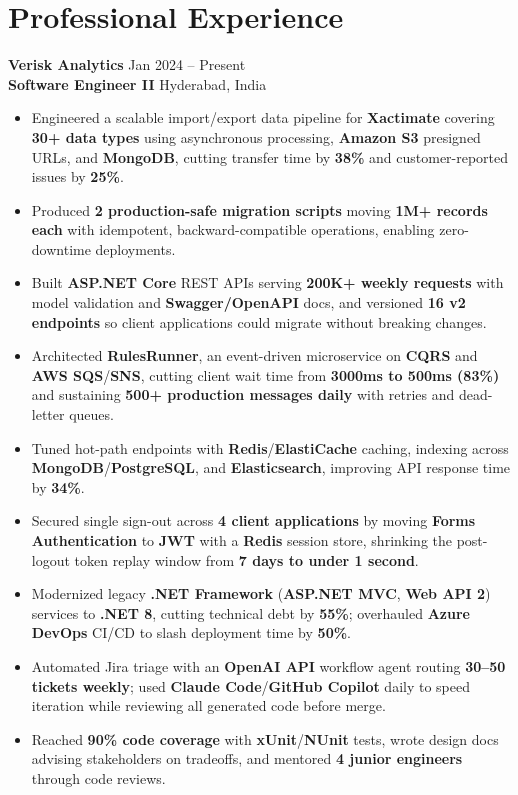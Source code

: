 \documentclass[letterpaper,10pt]{article}
\begin{document}
\section*{Professional Experience}

\textbf{Verisk Analytics} \hfill Jan 2024 -- Present \\
\textbf{Software Engineer II} \hfill Hyderabad, India
\begin{itemize}
    \item Engineered a scalable import/export data pipeline for \textbf{Xactimate} covering \textbf{30+ data types} using asynchronous processing, \textbf{Amazon S3} presigned URLs, and \textbf{MongoDB}, cutting transfer time by \textbf{38\%} and customer-reported issues by \textbf{25\%}.
    \item Produced \textbf{2 production-safe migration scripts} moving \textbf{1M+ records each} with idempotent, backward-compatible operations, enabling zero-downtime deployments.
    \item Built \textbf{ASP.NET Core} REST APIs serving \textbf{200K+ weekly requests} with model validation and \textbf{Swagger/OpenAPI} docs, and versioned \textbf{16 v2 endpoints} so client applications could migrate without breaking changes.
    \item Architected \textbf{RulesRunner}, an event-driven microservice on \textbf{CQRS} and \textbf{AWS SQS}/\textbf{SNS}, cutting client wait time from \textbf{3000ms to 500ms (83\%)} and sustaining \textbf{500+ production messages daily} with retries and dead-letter queues.
    \item Tuned hot-path endpoints with \textbf{Redis}/\textbf{ElastiCache} caching, indexing across \textbf{MongoDB}/\textbf{PostgreSQL}, and \textbf{Elasticsearch}, improving API response time by \textbf{34\%}.
    \item Secured single sign-out across \textbf{4 client applications} by moving \textbf{Forms Authentication} to \textbf{JWT} with a \textbf{Redis} session store, shrinking the post-logout token replay window from \textbf{7 days to under 1 second}.
    \item Modernized legacy \textbf{.NET Framework} (\textbf{ASP.NET MVC}, \textbf{Web API 2}) services to \textbf{.NET 8}, cutting technical debt by \textbf{55\%}; overhauled \textbf{Azure DevOps} CI/CD to slash deployment time by \textbf{50\%}.
    \item Automated Jira triage with an \textbf{OpenAI API} workflow agent routing \textbf{30--50 tickets weekly}; used \textbf{Claude Code}/\textbf{GitHub Copilot} daily to speed iteration while reviewing all generated code before merge.
    \item Reached \textbf{90\% code coverage} with \textbf{xUnit}/\textbf{NUnit} tests, wrote design docs advising stakeholders on tradeoffs, and mentored \textbf{4 junior engineers} through code reviews.
\end{itemize}
\end{document}
